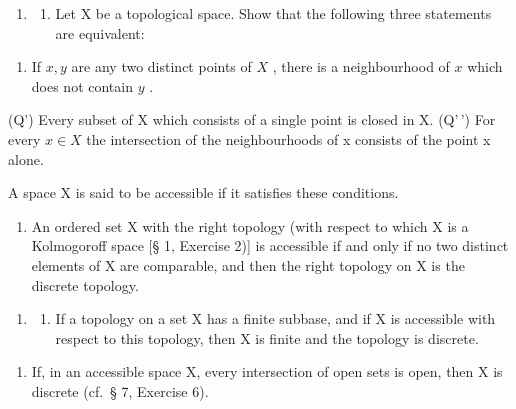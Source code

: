 \BourbakiExerciseGroup

\begin{enumerate}
\def\labelenumi{\arabic{enumi})}
\tightlist
\item
  \begin{enumerate}
  \def\labelenumii{\alph{enumii})}
  \tightlist
  \item
    Let X be a topological space. Show that the following three statements are equivalent:
  \end{enumerate}
\end{enumerate}

\begin{enumerate}
\def\labelenumi{(\Alph{enumi})}
\setcounter{enumi}{16}
\tightlist
\item
  If \(x, y\) are any two distinct points of \(X\) , there is a neighbourhood of \(x\) which does not contain \(y\) .
\end{enumerate}

(Q') Every subset of X which consists of a single point is closed in X. (Q'\,') For every \(x \in X\) the intersection of the neighbourhoods of x consists of the point x alone.

A space X is said to be accessible if it satisfies these conditions.

\begin{enumerate}
\def\labelenumi{\alph{enumi})}
\setcounter{enumi}{1}
\tightlist
\item
  An ordered set X with the right topology (with respect to which X is a Kolmogoroff space {[}§ 1, Exercise 2){]} is accessible if and only if no two distinct elements of X are comparable, and then the right topology on X is the discrete topology.
\end{enumerate}

\begin{enumerate}
\def\labelenumi{\arabic{enumi})}
\setcounter{enumi}{1}
\tightlist
\item
  \begin{enumerate}
  \def\labelenumii{\alph{enumii})}
  \tightlist
  \item
    If a topology on a set X has a finite subbase, and if X is accessible with respect to this topology, then X is finite and the topology is discrete.
  \end{enumerate}
\end{enumerate}

\begin{enumerate}
\def\labelenumi{\alph{enumi})}
\setcounter{enumi}{1}
\tightlist
\item
  If, in an accessible space X, every intersection of open sets is open, then X is discrete (cf.~§ 7, Exercise 6).
\end{enumerate}

